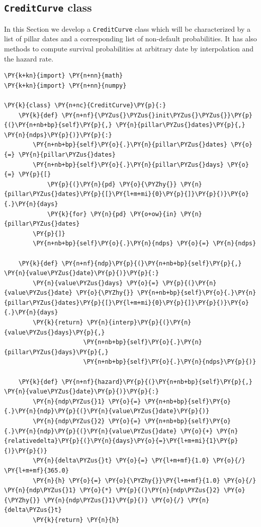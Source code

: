\subsection{\texttt{CreditCurve} class}

In this Section we develop a \texttt{CreditCurve} class which will be characterized by a list of pillar dates and a corresponding list of non-default probabilities. It has also methods to compute survival probabilities at arbitrary date by interpolation and the hazard rate.
  
\begin{tcolorbox}[breakable, size=fbox, boxrule=1pt, pad at break*=1mm,colback=cellbackground, colframe=cellborder]
\begin{Verbatim}[commandchars=\\\{\}]
\PY{k+kn}{import} \PY{n+nn}{math}
\PY{k+kn}{import} \PY{n+nn}{numpy}

\PY{k}{class} \PY{n+nc}{CreditCurve}\PY{p}{:}
    \PY{k}{def} \PY{n+nf}{\PYZus{}\PYZus{}init\PYZus{}\PYZus{}}\PY{p}{(}\PY{n+nb+bp}{self}\PY{p}{,} \PY{n}{pillar\PYZus{}dates}\PY{p}{,} \PY{n}{ndps}\PY{p}{)}\PY{p}{:}    
        \PY{n+nb+bp}{self}\PY{o}{.}\PY{n}{pillar\PYZus{}dates} \PY{o}{=} \PY{n}{pillar\PYZus{}dates}
        \PY{n+nb+bp}{self}\PY{o}{.}\PY{n}{pillar\PYZus{}days} \PY{o}{=} \PY{p}{[}
            \PY{p}{(}\PY{n}{pd} \PY{o}{\PYZhy{}} \PY{n}{pillar\PYZus{}dates}\PY{p}{[}\PY{l+m+mi}{0}\PY{p}{]}\PY{p}{)}\PY{o}{.}\PY{n}{days}
            \PY{k}{for} \PY{n}{pd} \PY{o+ow}{in} \PY{n}{pillar\PYZus{}dates}
        \PY{p}{]}
        \PY{n+nb+bp}{self}\PY{o}{.}\PY{n}{ndps} \PY{o}{=} \PY{n}{ndps}
        
    \PY{k}{def} \PY{n+nf}{ndp}\PY{p}{(}\PY{n+nb+bp}{self}\PY{p}{,} \PY{n}{value\PYZus{}date}\PY{p}{)}\PY{p}{:}
        \PY{n}{value\PYZus{}days} \PY{o}{=} \PY{p}{(}\PY{n}{value\PYZus{}date} \PY{o}{\PYZhy{}} \PY{n+nb+bp}{self}\PY{o}{.}\PY{n}{pillar\PYZus{}dates}\PY{p}{[}\PY{l+m+mi}{0}\PY{p}{]}\PY{p}{)}\PY{o}{.}\PY{n}{days}
        \PY{k}{return} \PY{n}{interp}\PY{p}{(}\PY{n}{value\PYZus{}days}\PY{p}{,}
                      \PY{n+nb+bp}{self}\PY{o}{.}\PY{n}{pillar\PYZus{}days}\PY{p}{,}
                      \PY{n+nb+bp}{self}\PY{o}{.}\PY{n}{ndps}\PY{p}{)}
    
    \PY{k}{def} \PY{n+nf}{hazard}\PY{p}{(}\PY{n+nb+bp}{self}\PY{p}{,} \PY{n}{value\PYZus{}date}\PY{p}{)}\PY{p}{:}
        \PY{n}{ndp\PYZus{}1} \PY{o}{=} \PY{n+nb+bp}{self}\PY{o}{.}\PY{n}{ndp}\PY{p}{(}\PY{n}{value\PYZus{}date}\PY{p}{)}
        \PY{n}{ndp\PYZus{}2} \PY{o}{=} \PY{n+nb+bp}{self}\PY{o}{.}\PY{n}{ndp}\PY{p}{(}\PY{n}{value\PYZus{}date} \PY{o}{+} \PY{n}{relativedelta}\PY{p}{(}\PY{n}{days}\PY{o}{=}\PY{l+m+mi}{1}\PY{p}{)}\PY{p}{)}
        \PY{n}{delta\PYZus{}t} \PY{o}{=} \PY{l+m+mf}{1.0} \PY{o}{/} \PY{l+m+mf}{365.0}
        \PY{n}{h} \PY{o}{=} \PY{o}{\PYZhy{}}\PY{l+m+mf}{1.0} \PY{o}{/} \PY{n}{ndp\PYZus{}1} \PY{o}{*} \PY{p}{(}\PY{n}{ndp\PYZus{}2} \PY{o}{\PYZhy{}} \PY{n}{ndp\PYZus{}1}\PY{p}{)} \PY{o}{/} \PY{n}{delta\PYZus{}t}
        \PY{k}{return} \PY{n}{h}
\end{Verbatim}
\end{tcolorbox}    

